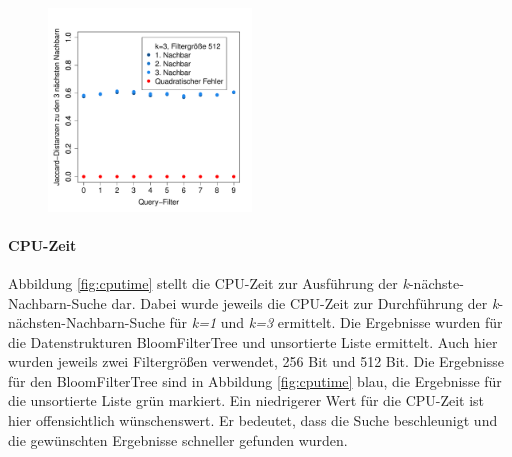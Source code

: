 \begin{figure}[hpbt]
	\hspace{0.01\textwidth}
	\includegraphics[width=0.48\textwidth]{pictures/nn3_512-2.pdf}\\
\end{figure}
\paragraph*{CPU-Zeit} 
Abbildung \ref{fig:cputime} stellt die CPU-Zeit zur Ausführung der \textit{k}-nächste-Nachbarn-Suche dar. Dabei wurde jeweils die CPU-Zeit zur Durchführung der \textit{k}-nächsten-Nachbarn-Suche für \textit{k=1} und \textit{k=3} ermittelt. Die Ergebnisse wurden für die Datenstrukturen BloomFilterTree und unsortierte Liste ermittelt. Auch hier wurden jeweils zwei Filtergrößen verwendet, 256 Bit und 512 Bit. Die Ergebnisse für den BloomFilterTree sind in Abbildung \ref{fig:cputime} blau, die Ergebnisse für die unsortierte Liste grün markiert. Ein niedrigerer Wert für die CPU-Zeit ist hier offensichtlich wünschenswert. Er bedeutet, dass die Suche beschleunigt und die gewünschten Ergebnisse schneller gefunden wurden. 
